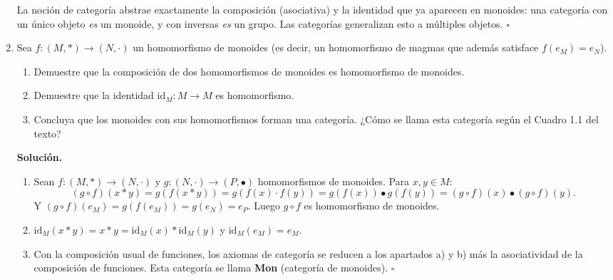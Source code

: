 \begin{enumerate}[label=\textbf{4.\arabic*.}]
La noción de categoría abstrae exactamente la composición (asociativa) y la
identidad que ya aparecen en monoides: una categoría con un único objeto
\textit{es} un monoide, y con inversas \textit{es} un grupo. Las categorías
generalizan esto a múltiples objetos. \hfill\(\square\)

\item Sea \(f:(M,*) \to (N,\cdot)\) un homomorfismo de monoides
(es decir, un homomorfismo de magmas que además satisface \(f(e_M)=e_N\)).
\begin{enumerate}[label=\alph*)]
    \item Demuestre que la composición de dos homomorfismos de monoides es
    homomorfismo de monoides.
    \item Demuestre que la identidad \(\mathrm{id}_M : M \to M\) es homomorfismo.
    \item Concluya que los monoides con sus homomorfismos forman una categoría.
    ¿Cómo se llama esta categoría según el Cuadro 1.1 del texto?
\end{enumerate}

\textbf{Solución.}
\begin{enumerate}[label=\alph*)]
    \item Sean \(f:(M,*)\to(N,\cdot)\) y \(g:(N,\cdot)\to(P,\bullet)\)
    homomorfismos de monoides. Para \(x,y \in M\):
    \[
        (g\circ f)(x*y) = g(f(x*y)) = g(f(x)\cdot f(y)) = g(f(x))\bullet g(f(y))
                        = (g\circ f)(x) \bullet (g\circ f)(y).
    \]
    Y \((g\circ f)(e_M) = g(f(e_M)) = g(e_N) = e_P\). Luego \(g\circ f\) es
    homomorfismo de monoides.
    \item \(\mathrm{id}_M(x*y)=x*y=\mathrm{id}_M(x)*\mathrm{id}_M(y)\) y
    \(\mathrm{id}_M(e_M)=e_M\).
    \item Con la composición usual de funciones, los axiomas de categoría se reducen
    a los apartados a) y b) más la asociatividad de la composición de funciones.
    Esta categoría se llama \textbf{Mon} (categoría de monoides).
    \hfill\(\square\)
\end{enumerate}


\end{enumerate}
